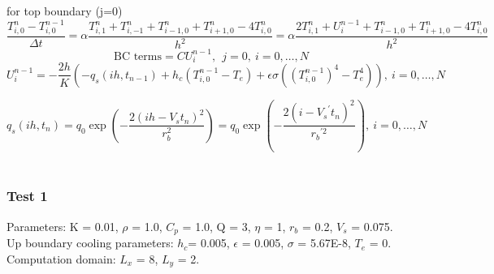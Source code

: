 \documentclass[a4paper,12pt]{article}
\begin{document}
for top boundary (j=0)
\begin{equation}
\frac{T_{i,0}^n - T_{i,0}^{n-1}}{\Delta t} = \alpha \frac{T_{i,1}^n + T_{i,-1}^n + T_{i-1,0}^n + T_{i+1,0}^n - 4 T_{i,0}^n }{h^2} =\alpha \frac{2T_{i,1}^n + U_i^{n-1}+ T_{i-1,0}^n + T_{i+1,0}^n - 4 T_{i,0}^n }{h^2} 
\end{equation}
\begin{equation}
 \text{BC terms}=CU_i^{n-1},\ \  j=0,  \ i = 0 , \dots , N
\end{equation}
\begin{equation}
U_i^{n-1}=-\frac{2h}{K}\left(-q_s (ih, t_{n-1}) + h_c (T^{n-1}_{i,0} - T_e) + \epsilon \sigma ( (T^{n-1}_{i,0})^4 - T_e^4)\right), \ i = 0 , \dots , N
\end{equation}

\begin{equation}
q_s (ih, t_n) =q_0\exp \left( -\frac{ 2(ih-V_s t_n)^2}{ r_b^2} \right)= q_0\exp \left( -\frac{ 2(i-{V_s}^{'} t_n)^2}{{ r_b}^{'2}} \right) , \ i = 0 , \dots , N
\end{equation}
\\
\subsubsection{Test 1}
Parameters: K = 0.01, $\rho$ = 1.0, $C_p$ = 1.0, Q = 3, $\eta$ = 1, $r_b$ = 0.2, $V_s$ = 0.075. \\
Up boundary cooling parameters: $h_c$= 0.005, $\epsilon$ = 0.005, $\sigma$ = 5.67E-8, $T_e$ = 0.\\
Computation domain: $L_x$ = 8, $L_y$ = 2.
\end{document}
